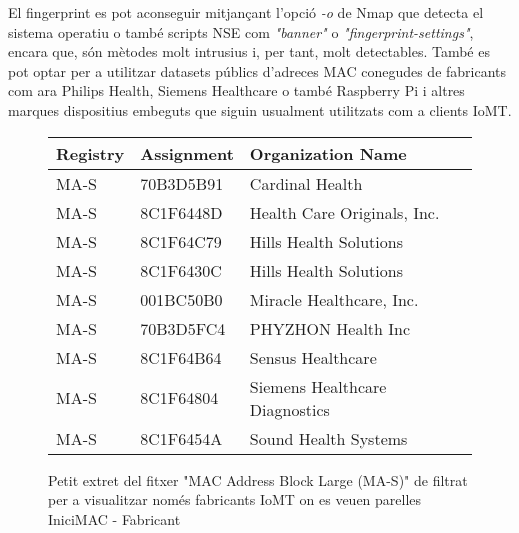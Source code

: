 El fingerprint es pot aconseguir mitjançant l'opció \textit{-o} de Nmap que detecta el sistema operatiu o també scripts NSE com \textit{"banner"} o \textit{"fingerprint-settings"}, encara que, són mètodes molt intrusius i, per tant, molt detectables. També es pot optar per a utilitzar datasets públics d'adreces MAC conegudes de fabricants com ara Philips Health, Siemens Healthcare o també Raspberry Pi i altres marques dispositius embeguts que siguin usualment utilitzats com a clients IoMT.

\begin{figure}[H]
\centering
\begin{tabular}{@{}lll@{}}
\toprule
\textbf{Registry} & \textbf{Assignment} & \textbf{Organization Name} \\
\midrule
MA-S & 70B3D5B91 & Cardinal Health \\
MA-S & 8C1F6448D & Health Care Originals, Inc. \\
MA-S & 8C1F64C79 & Hills Health Solutions \\
MA-S & 8C1F6430C & Hills Health Solutions \\
MA-S & 001BC50B0 & Miracle Healthcare, Inc. \\
MA-S & 70B3D5FC4 & PHYZHON Health Inc \\
MA-S & 8C1F64B64 & Sensus Healthcare \\
MA-S & 8C1F64804 & Siemens Healthcare Diagnostics \\
MA-S & 8C1F6454A & Sound Health Systems \\
\bottomrule
\end{tabular}
\caption{Petit extret del fitxer "MAC Address Block Large (MA-S)" de \cite{iotmaclist} filtrat per a visualitzar només fabricants IoMT on es veuen parelles IniciMAC - Fabricant}  %
\label{fig:iot_manufacturers}
\end{figure}
